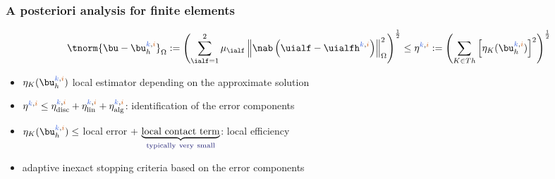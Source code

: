 
\begin{frame}
\frametitle{A posteriori analysis for finite elements}
\begin{equation*}
\tnorm{\bu-\bu_h^{\kk,\ii}}_{\Omega} \egaldef \left(\sum_{\ialf = 1}^2 \mu_\ialf \left\|\nab \left(\uialf-\uialfh^{\kk,\ii} \right)\right\|_{\Omega}^2 \right)^{\frac{1}{2}} \leq \eta^{\kk,\ii} \egaldef \left(\sum_{K \in Th}\left[\eta_{K}(\bu_h^{\kk,\ii}) \right]^2\right)^{\frac{1}{2}}
\end{equation*}
\begin{itemize}
\item $\eta_{K}(\bu_h^{\kk,\ii})$ local estimator depending on the approximate solution 
\item $\eta^{\kk,\ii} \leq \eta_{\mathrm{disc}}^{\kk,\ii} + \eta_{\mathrm{lin}}^{\kk,\ii} + \eta_{\mathrm{alg}}^{\kk,\ii}$: identification of the error components
\item $\eta_{K}(\bu_h^{\kk,\ii}) \leq$ local error + $\underbrace{\mathrm{local \ contact \ term}}_{\mathrm{\textcolor{midnightblue}{typically \ very \ small}}}$: local efficiency
\item adaptive inexact stopping criteria based on the error components
\end{itemize} 
\end{frame}
%
